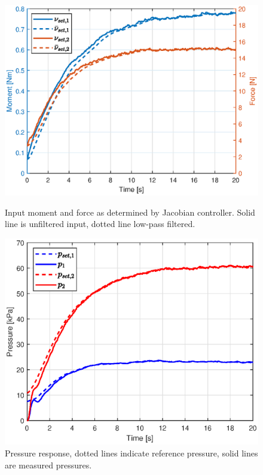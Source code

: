 \newpage



\begin{figure}[H] 
    \begin{minipage}[b]{0.49\linewidth}
     \centering
    \includegraphics[width=\linewidth]{Figures/Chapter5/nuright.eps} 
    \caption{Input moment and force as determined by Jacobian controller. Solid line is unfiltered input, dotted line low-pass filtered. } 
    \label{fig5:nuright} 
       \end{minipage} 
    \begin{minipage}[b]{0.49\linewidth}
     \centering
    \includegraphics[width=\linewidth]{Figures/Chapter5/pressureright.eps} 
    \caption{Pressure response, dotted lines indicate reference pressure, solid lines are measured pressures.} 
    \label{fig5:pright} 
    \end{minipage} 
\end{figure}



